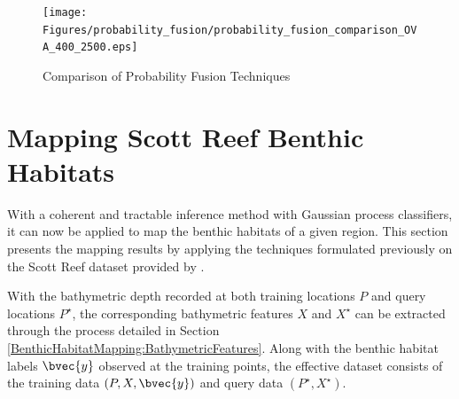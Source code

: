 				\begin{figure}[!htbp]
				\centering
					\texttt{[image: Figures/probability\_fusion/probability\_fusion\_comparison\_OVA\_400\_2500.eps]}
				\caption{Comparison of Probability Fusion Techniques}
				\label{Figure:ProbabilityFusion}
				\end{figure}
				
	\section{Mapping Scott Reef Benthic Habitats}
	\label{BenthicHabitatMapping:ScottReef}
		
		With a coherent and tractable inference method with Gaussian process classifiers, it can now be applied to map the benthic habitats of a given region. This section presents the mapping results by applying the techniques formulated previously on the Scott Reef dataset provided by \cite{IMOS}.  
			
		With the bathymetric depth recorded at both training locations $P$ and query locations $P^{\star}$, the corresponding bathymetric features $X$ and $X^{\star}$ can be extracted through the process detailed in Section \ref{BenthicHabitatMapping:BathymetricFeatures}. Along with the benthic habitat labels $\bvec{y}$ observed at the training points, the effective dataset consists of the training data $(P, X, \bvec{y})$ and query data $(P^{\star}, X^{\star})$.

